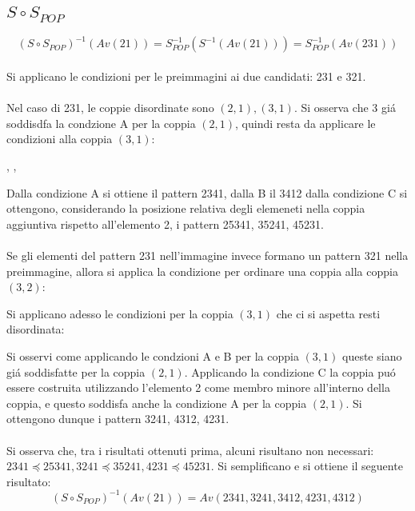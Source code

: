 \subsection*{$S\circ{S_{POP}}$}
$$(S\circ{S_{POP}})^{-1}(Av(21)) = S_{POP}^{-1}(S^{-1}(Av(21))) = S_{POP}^{-1}(Av(231))$$
\\Si applicano le condizioni per le preimmagini ai due candidati: 231 e 321.\\\\
Nel caso di 231, le coppie disordinate sono $(2,1),(3,1)$. Si osserva che 3 gi\'a soddisdfa la condzione A per la coppia $(2,1)$, quindi resta da applicare le condizioni alla coppia $(3,1)$:
\begin{center}
,
,
\end{center}
Dalla condizione A si ottiene il pattern 2341, dalla B il 3412 dalla condizione C si ottengono, considerando la posizione relativa degli elemeneti nella coppia aggiuntiva rispetto all'elemento 2, i pattern 25341, 35241, 45231.\\\\
Se gli elementi del pattern 231 nell'immagine invece formano un pattern 321 nella preimmagine, allora si applica la condizione per ordinare una coppia alla coppia $(3,2)$:
\begin{center}
\end{center}
Si applicano adesso le condizioni per la coppia $(3,1)$ che ci si aspetta resti disordinata:
\begin{center}
\end{center}
Si osservi come applicando le condzioni A e B per la coppia $(3,1)$ queste siano gi\'a soddisfatte per la coppia $(2,1)$. Applicando la condizione C la coppia pu\'o essere costruita utilizzando l'elemento 2 come membro minore all'interno della coppia, e questo soddisfa anche la condizione A per la coppia $(2,1)$. Si ottengono dunque i pattern 3241, 4312, 4231.\\\\
Si osserva che, tra i risultati ottenuti prima, alcuni risultano non necessari: $2341\preceq25341, 3241\preceq35241, 4231\preceq45231$. Si semplificano e si ottiene il seguente risultato:
$$(S\circ{S_{POP}})^{-1}(Av(21)) = Av(2341, 3241, 3412, 4231, 4312)$$
